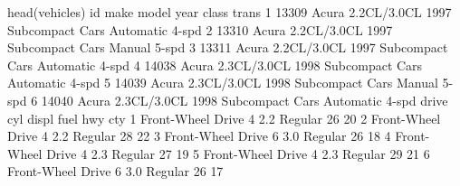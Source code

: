 \documentclass[
]{book}
\newenvironment{Shaded}{\begin{snugshade}}{\end{snugshade}}
\newcommand{\DecValTok}[1]{\textcolor[rgb]{0.00,0.00,0.81}{#1}}
\newcommand{\FloatTok}[1]{\textcolor[rgb]{0.00,0.00,0.81}{#1}}
\newcommand{\FunctionTok}[1]{\textcolor[rgb]{0.00,0.00,0.00}{#1}}
\newcommand{\NormalTok}[1]{#1}
\newcommand{\SpecialCharTok}[1]{\textcolor[rgb]{0.00,0.00,0.00}{#1}}
\begin{document}
\begin{Shaded}
\begin{Highlighting}[]
\FunctionTok{head}\NormalTok{(vehicles) }
\NormalTok{     id  make       model year           class           trans}
\DecValTok{1} \DecValTok{13309}\NormalTok{ Acura }\FloatTok{2.2}\NormalTok{CL}\SpecialCharTok{/}\FloatTok{3.0}\NormalTok{CL }\DecValTok{1997}\NormalTok{ Subcompact Cars Automatic }\DecValTok{4}\SpecialCharTok{{-}}\NormalTok{spd}
\DecValTok{2} \DecValTok{13310}\NormalTok{ Acura }\FloatTok{2.2}\NormalTok{CL}\SpecialCharTok{/}\FloatTok{3.0}\NormalTok{CL }\DecValTok{1997}\NormalTok{ Subcompact Cars    Manual }\DecValTok{5}\SpecialCharTok{{-}}\NormalTok{spd}
\DecValTok{3} \DecValTok{13311}\NormalTok{ Acura }\FloatTok{2.2}\NormalTok{CL}\SpecialCharTok{/}\FloatTok{3.0}\NormalTok{CL }\DecValTok{1997}\NormalTok{ Subcompact Cars Automatic }\DecValTok{4}\SpecialCharTok{{-}}\NormalTok{spd}
\DecValTok{4} \DecValTok{14038}\NormalTok{ Acura }\FloatTok{2.3}\NormalTok{CL}\SpecialCharTok{/}\FloatTok{3.0}\NormalTok{CL }\DecValTok{1998}\NormalTok{ Subcompact Cars Automatic }\DecValTok{4}\SpecialCharTok{{-}}\NormalTok{spd}
\DecValTok{5} \DecValTok{14039}\NormalTok{ Acura }\FloatTok{2.3}\NormalTok{CL}\SpecialCharTok{/}\FloatTok{3.0}\NormalTok{CL }\DecValTok{1998}\NormalTok{ Subcompact Cars    Manual }\DecValTok{5}\SpecialCharTok{{-}}\NormalTok{spd}
\DecValTok{6} \DecValTok{14040}\NormalTok{ Acura }\FloatTok{2.3}\NormalTok{CL}\SpecialCharTok{/}\FloatTok{3.0}\NormalTok{CL }\DecValTok{1998}\NormalTok{ Subcompact Cars Automatic }\DecValTok{4}\SpecialCharTok{{-}}\NormalTok{spd}
\NormalTok{              drive cyl displ    fuel hwy cty}
\DecValTok{1}\NormalTok{ Front}\SpecialCharTok{{-}}\NormalTok{Wheel Drive   }\DecValTok{4}   \FloatTok{2.2}\NormalTok{ Regular  }\DecValTok{26}  \DecValTok{20}
\DecValTok{2}\NormalTok{ Front}\SpecialCharTok{{-}}\NormalTok{Wheel Drive   }\DecValTok{4}   \FloatTok{2.2}\NormalTok{ Regular  }\DecValTok{28}  \DecValTok{22}
\DecValTok{3}\NormalTok{ Front}\SpecialCharTok{{-}}\NormalTok{Wheel Drive   }\DecValTok{6}   \FloatTok{3.0}\NormalTok{ Regular  }\DecValTok{26}  \DecValTok{18}
\DecValTok{4}\NormalTok{ Front}\SpecialCharTok{{-}}\NormalTok{Wheel Drive   }\DecValTok{4}   \FloatTok{2.3}\NormalTok{ Regular  }\DecValTok{27}  \DecValTok{19}
\DecValTok{5}\NormalTok{ Front}\SpecialCharTok{{-}}\NormalTok{Wheel Drive   }\DecValTok{4}   \FloatTok{2.3}\NormalTok{ Regular  }\DecValTok{29}  \DecValTok{21}
\DecValTok{6}\NormalTok{ Front}\SpecialCharTok{{-}}\NormalTok{Wheel Drive   }\DecValTok{6}   \FloatTok{3.0}\NormalTok{ Regular  }\DecValTok{26}  \DecValTok{17}


\end{Highlighting}
\end{Shaded}
\end{document}
